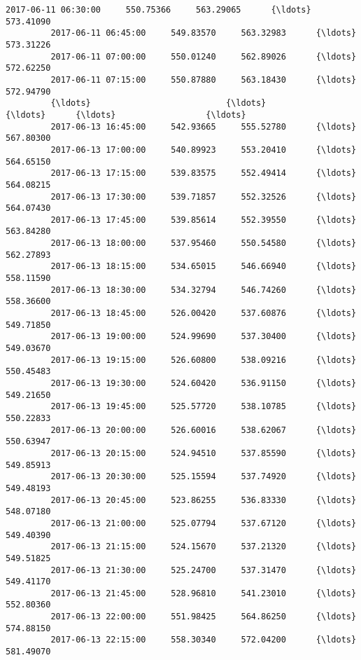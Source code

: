 \documentclass[11pt]{article}
\begin{document}
\begin{Verbatim}[commandchars=\\\{\}]
         2017-06-11 06:30:00     550.75366     563.29065      {\ldots}            573.41090   
         2017-06-11 06:45:00     549.83570     563.32983      {\ldots}            573.31226   
         2017-06-11 07:00:00     550.01240     562.89026      {\ldots}            572.62250   
         2017-06-11 07:15:00     550.87880     563.18430      {\ldots}            572.94790   
         {\ldots}                           {\ldots}           {\ldots}      {\ldots}                  {\ldots}   
         2017-06-13 16:45:00     542.93665     555.52780      {\ldots}            567.80300   
         2017-06-13 17:00:00     540.89923     553.20410      {\ldots}            564.65150   
         2017-06-13 17:15:00     539.83575     552.49414      {\ldots}            564.08215   
         2017-06-13 17:30:00     539.71857     552.32526      {\ldots}            564.07430   
         2017-06-13 17:45:00     539.85614     552.39550      {\ldots}            563.84280   
         2017-06-13 18:00:00     537.95460     550.54580      {\ldots}            562.27893   
         2017-06-13 18:15:00     534.65015     546.66940      {\ldots}            558.11590   
         2017-06-13 18:30:00     534.32794     546.74260      {\ldots}            558.36600   
         2017-06-13 18:45:00     526.00420     537.60876      {\ldots}            549.71850   
         2017-06-13 19:00:00     524.99690     537.30400      {\ldots}            549.03670   
         2017-06-13 19:15:00     526.60800     538.09216      {\ldots}            550.45483   
         2017-06-13 19:30:00     524.60420     536.91150      {\ldots}            549.21650   
         2017-06-13 19:45:00     525.57720     538.10785      {\ldots}            550.22833   
         2017-06-13 20:00:00     526.60016     538.62067      {\ldots}            550.63947   
         2017-06-13 20:15:00     524.94510     537.85590      {\ldots}            549.85913   
         2017-06-13 20:30:00     525.15594     537.74920      {\ldots}            549.48193   
         2017-06-13 20:45:00     523.86255     536.83330      {\ldots}            548.07180   
         2017-06-13 21:00:00     525.07794     537.67120      {\ldots}            549.40390   
         2017-06-13 21:15:00     524.15670     537.21320      {\ldots}            549.51825   
         2017-06-13 21:30:00     525.24700     537.31470      {\ldots}            549.41170   
         2017-06-13 21:45:00     528.96810     541.23010      {\ldots}            552.80360   
         2017-06-13 22:00:00     551.98425     564.86250      {\ldots}            574.88150   
         2017-06-13 22:15:00     558.30340     572.04200      {\ldots}            581.49070   

\end{Verbatim}
\end{document}
